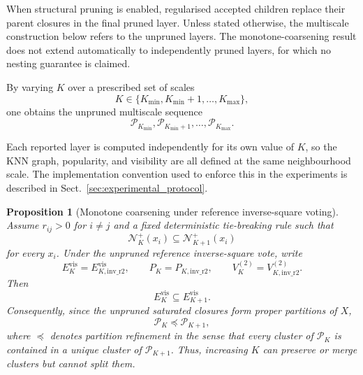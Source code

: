 \documentclass[review,12pt]{elsarticle}
\newtheorem{proposition}[theorem]{Proposition}
\newcommand{\calN}{\mathcal{N}}
\newcommand{\calP}{\mathcal{P}}
\begin{document}
When structural pruning is enabled, regularised accepted children replace
their parent closures in the final pruned layer. Unless stated otherwise,
the multiscale construction below refers to the unpruned layers. The
monotone-coarsening result does not extend automatically to independently
pruned layers, for which no nesting guarantee is claimed.

By varying $K$ over a prescribed set of scales
\begin{equation}
K\in
\{K_{\min},K_{\min}+1,\ldots,K_{\max}\},
\end{equation}
one obtains the unpruned multiscale sequence
\begin{equation}
\calP_{K_{\min}},
\calP_{K_{\min}+1},
\ldots,
\calP_{K_{\max}}.
\end{equation}

Each reported layer is computed independently for its own value of $K$, so
the KNN graph, popularity, and visibility are all defined at the same
neighbourhood scale. The implementation convention used to enforce this in the
experiments is described in Sect.~\ref{sec:experimental_protocol}.

\begin{proposition}[Monotone coarsening under reference inverse-square voting]
\label{prop:inverse_square_coarsening}
Assume $r_{ij}>0$ for $i\neq j$ and a fixed deterministic tie-breaking rule
such that
\begin{equation}
\calN_K^+(x_i)\subseteq\calN_{K+1}^+(x_i)
\label{eq:nested_knn}
\end{equation}
for every $x_i$. Under the unpruned reference inverse-square vote, write
\begin{equation}
E_K^{\mathrm{vis}}
=
E_{K,\mathrm{inv\_r2}}^{\mathrm{vis}},
\qquad
P_K
=
P_{K,\mathrm{inv\_r2}},
\qquad
V_K^{(2)}
=
V_{K,\mathrm{inv\_r2}}^{(2)}.
\label{eq:inverse_square_shorthand}
\end{equation}
Then
\begin{equation}
E_K^{\mathrm{vis}}
\subseteq
E_{K+1}^{\mathrm{vis}}.
\label{eq:nested_visible_edges}
\end{equation}
Consequently, since the unpruned saturated closures form proper partitions of \(X\),
\begin{equation}
\calP_K\preceq\calP_{K+1},
\label{eq:partition_refinement}
\end{equation}
where $\preceq$ denotes partition refinement in the sense that every cluster
of $\calP_K$ is contained in a unique cluster of $\calP_{K+1}$. Thus,
increasing $K$ can preserve or merge clusters but cannot split them.
\end{proposition}
\end{document}
